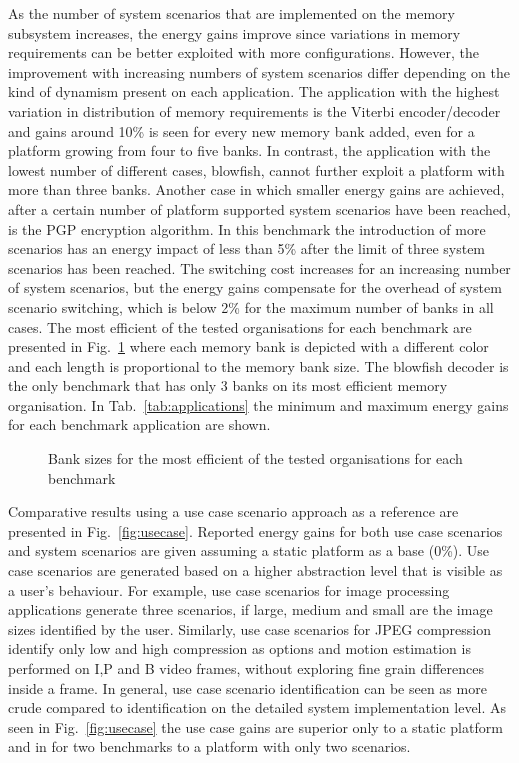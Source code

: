 \documentclass{acm_proc_article-sp}
\begin{document}
As the number of system scenarios that are implemented on the memory subsystem increases, the energy gains improve since variations in memory requirements can be better exploited with more configurations. However, the improvement with increasing numbers of system scenarios differ depending on the kind of dynamism present on each application. The application with the highest variation in distribution of memory requirements is the Viterbi encoder/decoder and gains around 10\% is seen for every new memory bank added, even for a platform growing from four to five banks. In contrast, the application with the lowest number of different cases, blowfish, cannot further exploit a platform with more than three banks. Another case in which smaller energy gains are achieved, after a certain number of platform supported system scenarios have been reached, is the PGP encryption algorithm. In this benchmark the introduction of more scenarios has an energy impact of less than 5\% after the limit of three system scenarios has been reached. The switching cost increases for an increasing number of system scenarios, but the energy gains compensate for the overhead of system scenario switching, which is below 2\% for the maximum number of banks in all cases. The most efficient of the tested organisations for each benchmark are presented in Fig.~\ref{fig:banks} where each memory bank is depicted with a different color and each length is proportional to the memory bank size. The blowfish decoder is the only benchmark that has only 3 banks on its most efficient memory organisation. In Tab.~\ref{tab:applications} the minimum and maximum energy gains for each benchmark application are shown. 

\begin{figure}[!t]
\centering
\caption{Bank sizes for the most efficient of the tested organisations for each benchmark}
\label{fig:banks}
\end{figure}


Comparative results using a use case scenario approach as a reference are presented in Fig.~\ref{fig:usecase}. Reported energy gains for both use case scenarios and system scenarios are given assuming a static platform as a base (0\%). Use case scenarios are generated based on a higher abstraction level that is visible as a user's behaviour. For example, use case scenarios for image processing applications generate three scenarios, if large, medium and small are the image sizes identified by the user. Similarly, use case scenarios for JPEG compression identify only low and high compression as options and motion estimation is performed on I,P and B video frames, without exploring fine grain differences inside a frame. In general, use case scenario identification can be seen as more crude compared to identification on the detailed system implementation level. As seen in Fig.~\ref{fig:usecase} the use case gains are superior only to a static platform and in for two benchmarks to a platform with only two scenarios.  
\end{document}
